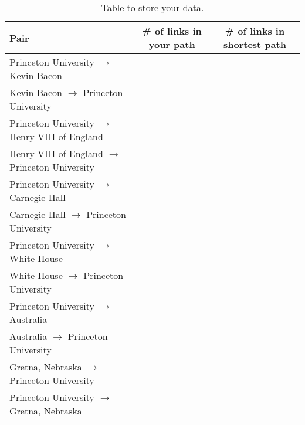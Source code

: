 \documentclass[addpoints]{exam}
\begin{document}
\begin{table}[!htbp]
\centering
\begin{tabular}{l|c|c}
Pair & \# of links in your path & \# of links in shortest path\\
\midrule
Princeton University $\rightarrow$ Kevin Bacon & &  \\
Kevin Bacon $\rightarrow$ Princeton University & & \\
Princeton University $\rightarrow$ Henry VIII of England & & \\ 
Henry VIII of England $\rightarrow$ Princeton University & & \\
Princeton University $\rightarrow$ Carnegie Hall & & \\
Carnegie Hall $\rightarrow$ Princeton University & & \\
Princeton University $\rightarrow$ White House & & \\
White House $\rightarrow$ Princeton University & & \\
Princeton University $\rightarrow$ Australia & & \\
Australia $\rightarrow$ Princeton University & & \\
Gretna, Nebraska $\rightarrow$ Princeton University & & \\
Princeton University $\rightarrow$ Gretna, Nebraska  & & \\
\bottomrule
\end{tabular}
\label{tab:results}
\caption{Table to store your data.}
\end{table}
\end{document}
